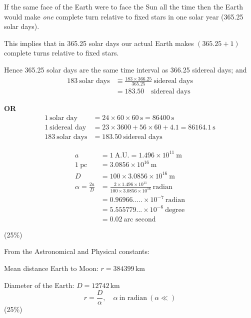 If the same face of the Earth were to face the Sun all the time then the Earth
would make \emph{one} complete turn relative to fixed stars in one solar year
(365.25 solar days).

This implies that in 365.25 solar days our actual Earth makes $(365.25+1)$
complete turns relative to fixed stars.

Hence 365.25 solar days are the same time interval as 366.25 sidereal days;
and
\begin{align*}
  183\ \text{solar days} &\equiv \frac{183 \times 366.25}{365.25}\
    \text{sidereal days} \\
  &= 183.50\quad\text{sidereal days}
\end{align*}

\noindent\textbf{OR}
\begin{align*}
  1\ \text{solar day} &= 24 \times 60 \times 60\ \mathrm{s} = 86400\ \mathrm{s} \\
  1\ \text{sidereal day} &= 23 \times 3600 + 56 \times 60 + 4.1 = 86164.1\ \mathrm{s} \\
  183\ \text{solar days} &= 183.50\ \text{sidereal days}
\end{align*}

\begin{align*}
  a &= 1\ \mathrm{A.U.} = 1.496 \times 10^{11}\ \mathrm{m} \\
  1\ \mathrm{pc} &= 3.0856 \times 10^{16}\ \mathrm{m} \\
  D &= 100 \times 3.0856 \times 10^{16}\ \mathrm{m} \\
  \alpha = \frac{2a}{D}
    &= \frac{2 \times 1.496 \times 10^{11}}{100 \times 3.0856 \times 10^{16}}\
      \text{radian} \\
    &= 0.96966..... \times 10^{-7}\ \text{radian} \\
    &= 5.555779... \times 10^{-6}\ \text{degree} \\
    &= 0.02\ \text{arc second}
\end{align*}

\hfill(25\%)

From the Astronomical and Physical constants:

Mean distance Earth to Moon: $r = 384399$\,km

Diameter of the Earth: $D = 12742$\,km
\[
  r = \frac{D}{\alpha}, \quad \alpha\ \text{in radian}\ (\alpha \ll)
\]
\hfill(25\%)

